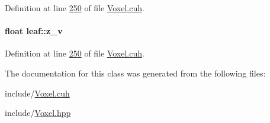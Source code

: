 Definition at line \hyperlink{Voxel_8cuh_source_l00250}{250} of file \hyperlink{Voxel_8cuh_source}{Voxel.\+cuh}.

\paragraph[{\texorpdfstring{z\+\_\+v}{z_v}}]{\setlength{\rightskip}{0pt plus 5cm}float leaf\+::z\+\_\+v}\hypertarget{classleaf_a5f51fe13eb6e53bd9549469011e7a10e}{}\label{classleaf_a5f51fe13eb6e53bd9549469011e7a10e}


Definition at line \hyperlink{Voxel_8cuh_source_l00250}{250} of file \hyperlink{Voxel_8cuh_source}{Voxel.\+cuh}.



The documentation for this class was generated from the following files\+:\begin{DoxyCompactItemize}
\item 
include/\hyperlink{Voxel_8cuh}{Voxel.\+cuh}\item 
include/\hyperlink{Voxel_8hpp}{Voxel.\+hpp}\end{DoxyCompactItemize}
